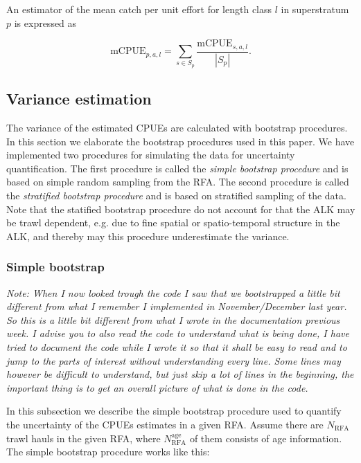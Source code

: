 \documentclass[a4paper 12pt]{article}
\numberwithin{equation}{section}
\begin{document}
An estimator of the mean catch per unit effort for length class $l$ in superstratum $p$ is expressed as


\begin{equation}
\mathrm{mCPUE}_{p,a,l} =  \sum\limits_{s \in S_{p}} \frac{\mathrm{mCPUE}_{s,a,l}}{|S_{p}|}.
\label{mcpueagerfa}
\end{equation}


\clearpage
\subsection{Variance estimation}
\label{bootall}
The variance of the estimated CPUEs are calculated with bootstrap procedures. In this section we elaborate the bootstrap procedures used in this paper. We have implemented two procedures for simulating the data for uncertainty quantification. The first procedure is called the \textit{simple bootstrap procedure} and is based on simple random sampling from the RFA. The second procedure is called the \textit{stratified bootstrap procedure} and is based on stratified sampling of the data. Note that the statified bootstrap procedure do not account for that the ALK may be trawl dependent, e.g. due to fine spatial or spatio-temporal structure in the ALK, and thereby may this procedure underestimate the variance.



\subsubsection{Simple bootstrap}
\label{simpleboot}
\textit{Note: When I now looked trough the code I saw that we bootstrapped a little bit different from what I remember I implemented in November/December last year. So this is a little bit different from what I wrote in the documentation previous week. I advise you to also read the code to understand what is being done, I have tried to document the code while I wrote it so that it shall be easy to read and to jump to the parts of interest without understanding every line. Some lines may however be difficult to understand, but just skip a lot of lines in the beginning, the important thing is to get an overall picture of what is done in the code.}

In this subsection we describe the simple bootstrap procedure used to quantify the uncertainty of the CPUEs estimates in a given RFA. Assume there are $N_{\text{RFA}}$ trawl hauls in the given RFA, where $N_{\text{RFA}}^{\text{age}}$ of them consists of age information. The simple bootstrap procedure works like this:
\end{document}
